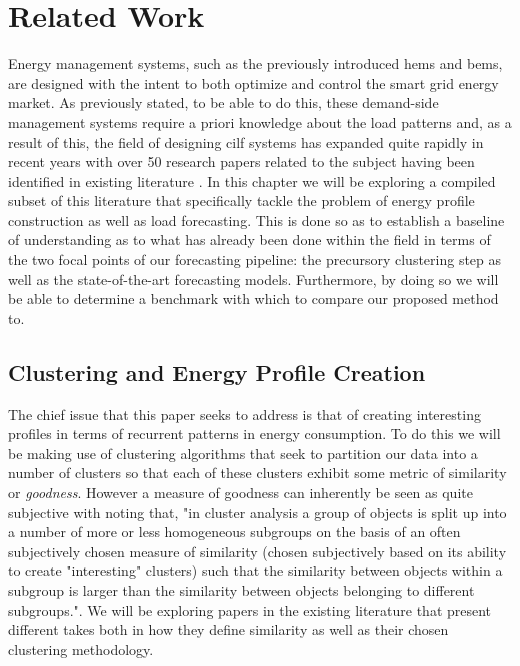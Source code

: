 \chapter{Related Work}
\label{ch:Related-Work}
Energy management systems, such as the previously introduced \gls{hems} and \gls{bems}, are designed with the intent to both optimize and control the smart grid energy market. As previously stated, to be able to do this, these demand-side management systems require a priori knowledge about the load patterns and, as a result of this, the field of designing \gls{cilf} systems has expanded quite rapidly in recent years with over 50 research papers related to the subject having been identified in existing literature \cite{Fallah}. In this chapter we will be exploring a compiled subset of this literature that specifically tackle the problem of energy profile construction as well as load forecasting. This is done so as to establish a baseline of understanding as to what has already been done within the field in terms of the two focal points of our forecasting pipeline: the precursory clustering step as well as the state-of-the-art forecasting models. Furthermore, by doing so we will be able to determine a benchmark with which to compare our proposed method to.

\section{Clustering and Energy Profile Creation}
\label{sec:Related-Work:Clustering-and-Energy-Profile-Creation}
The chief issue that this paper seeks to address is that of creating interesting profiles in terms of recurrent patterns in energy consumption. To do this we will be making use of clustering algorithms that seek to partition our data into a number of clusters so that each of these clusters exhibit some metric of similarity or \textit{goodness}. However a measure of goodness can inherently be seen as quite subjective with \citet{BackerJain} noting that, "in cluster analysis a group of objects is split up into a number of more or less homogeneous subgroups on the basis of an often subjectively chosen measure of similarity (\ie chosen subjectively based on its ability to create "interesting" clusters) such that the similarity between objects within a subgroup is larger than the similarity between objects belonging to different subgroups.". We will be exploring papers in the existing literature that present different takes both in how they define similarity as well as their chosen clustering methodology.

